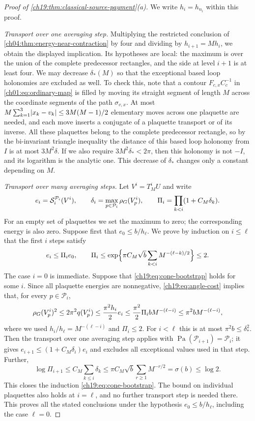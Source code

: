 \begin{proof}[Proof of \cref{ch19:thm:classical-source-payment}(a)]
We write $h_i=h_{n_i}$ within this proof.

\emph{Transport over one averaging step.} Multiplying the restricted conclusion of \cref{ch04:thm:energy-near-contraction} by four and dividing by $h_{i+1}=Mh_i$, we obtain the displayed implication. Its hypotheses are local: the maximum is over the union of the complete predecessor rectangles, and the side at level $i+1$ is at least four. We may decrease $\delta_*(M)$ so that the exceptional based loop holonomies are excluded as well. To check this, note that a contour $F_{c,x}C_c^{-1}$ in \eqref{ch01:eq:ordinary-map} is filled by moving its straight segment of length $M$ across the coordinate segments of the path $\sigma_{v,x}$. At most $M\sum_{k=1}^3\lvert x_k-v_k\rvert\le3M(M-1)/2$ elementary moves across one plaquette are needed, and each move inserts a conjugate of a plaquette transport or of its inverse. All these plaquettes belong to the complete predecessor rectangle, so by the bi-invariant triangle inequality the distance of this based loop holonomy from $I$ is at most $3M^2\delta$. If we also require $3M^2\delta_*<2\pi$, then this holonomy is not $-I$, and its logarithm is the analytic one. This decrease of $\delta_*$ changes only a constant depending on $M$.

\emph{Transport over many averaging steps.} Let $V^i=T_M^iU$ and write
\[
 e_i=\mathcal S_i^{\mathcal P_i}(V^i),\qquad
 \delta_i=\max_{p\in\mathcal P_i}\rho_G(V^i_p),\qquad
 \Pi_i=\prod_{k<i}(1+C_M\delta_k).
\]
For an empty set of plaquettes we set the maximum to zero; the corresponding energy is also zero. Suppose first that $e_0\le b/h_\ell$. We prove by induction on $i\le\ell$ that the first $i$ steps satisfy
\begin{equation}\label{ch19:eq:cone-bootstrap}
 e_i\le\Pi_ie_0,\qquad
 \Pi_i\le\exp\Bigl\{\pi C_M\sqrt b\sum_{k<i}M^{-(\ell-k)/2}\Bigr\}\le2.
\end{equation}
The case $i=0$ is immediate. Suppose that \eqref{ch19:eq:cone-bootstrap} holds for some $i$. Since all plaquette energies are nonnegative, \eqref{ch19:eq:angle-cost} implies that, for every $p\in\mathcal P_i$,
\[
 \rho_G(V^i_p)^2\le2\pi^2q(V^i_p)\le\frac{\pi^2h_i}{2}e_i\le\frac{\pi^2}{2}\Pi_ibM^{-(\ell-i)}\le\pi^2bM^{-(\ell-i)},
\]
where we used $h_i/h_\ell=M^{-(\ell-i)}$ and $\Pi_i\le2$. For $i<\ell$ this is at most $\pi^2b\le\delta_*^2$. Then the transport over one averaging step applies with $\operatorname{Pa}(\mathcal P_{i+1})=\mathcal P_i$; it gives $e_{i+1}\le(1+C_M\delta_i)e_i$ and excludes all exceptional values used in that step. Further,
\[
 \log\Pi_{i+1}\le C_M\sum_{k\le i}\delta_k\le\pi C_M\sqrt b\sum_{r\ge1}M^{-r/2}=\sigma(b)\le\log2.
\]
This closes the induction \eqref{ch19:eq:cone-bootstrap}. The bound on individual plaquettes also holds at $i=\ell$, and no further transport step is needed there. This proves all the stated conclusions under the hypothesis $e_0\le b/h_\ell$, including the case $\ell=0$.


\end{proof}
